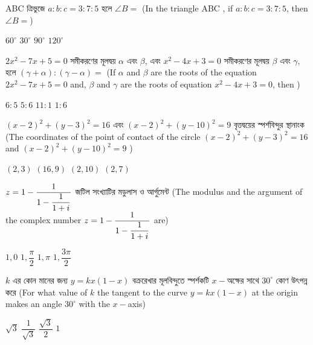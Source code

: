 \documentclass[addpoints]{exam}
\begin{document}
\begin{questions}
\question ABC ত্রিভুজে $ a:b:c = 3:7:5 $ হলে $ \angle B = $ (In the triangle ABC , if $ a:b:c = 3:7:5 $, then $ \angle B = $)

\begin{oneparchoices}
\choice $ 60^{\circ} $
\choice $ 30^{\circ} $
\choice $ 90^{\circ} $
\choice  $ 120^{\circ} $

\end{oneparchoices}

\question  $ 2x^{2}-7x+5 =0 $ সমীকরণের মূলদ্বয় $ \alpha $ এবং $ \beta $, এবং $ x^{2}-4x+3 =0 $ সমীকরণের মূলদ্বয় $ \beta $ এবং $ \gamma $, হলে $ (\gamma+\alpha):(\gamma -\alpha)= $ (If $ \alpha $ and $ \beta $ are the roots of the equation  $ 2x^{2}-7x+5 =0 $ and, $ \beta $ and $ \gamma $ are the roots of equation  $ x^{2}-4x+3 =0 $, then )


\begin{oneparchoices}
\choice $ 6:5 $
\choice $ 5:6 $
\choice $ 11:1 $
\choice  $ 1:6 $

\end{oneparchoices}

\question $ (x-2)^{2} + (y-3)^{2} = 16 $  এবং $ (x-2)^{2} + (y-10)^{2} = 9 $ বৃত্তদ্বয়ের স্পর্শবিন্দুর স্থানাংক (The coordinates of the point of contact of the circle $ (x-2)^{2} + (y-3)^{2} = 16 $ and $ (x-2)^{2} + (y-10)^{2} = 9 $ )

\begin{oneparchoices}
\choice $ (2,3) $
\choice $ (16,9) $
\choice $ (2,10) $
\choice  $ (2,7) $

\end{oneparchoices}

\question $ \mathlarger{z = 1-\dfrac{1}{1-\dfrac{1}{1+i}}} $ জটিল সংখ্যাটির মডুলাস ও আর্গুমেন্ট (The modulus and the argument of the complex number $ \mathlarger{z = 1-\dfrac{1}{1-\dfrac{1}{1+i}}} $ are)

\begin{oneparchoices}
\choice $1,0$
\choice $ 1, \dfrac{\pi}{2} $
\choice $ 1,\pi $
\choice  $ 1, \dfrac{3\pi}{2} $

\end{oneparchoices}

\question  $ k $  এর কোন মানের জন্য $ y =kx(1-x) $ বক্ররেখার মূলবিন্দুতে স্পর্শকটি $ x- $অক্ষের সাথে $ 30^{\circ} $ কোণ উৎপন্ন করে (For what value of $ k $ the tangent to the curve $ y =kx(1-x) $ at the origin makes an angle $ 30^{\circ} $ with the $x-$axis)

\begin{oneparchoices}
\choice $ \sqrt{3} $
\choice $ \dfrac{1}{\sqrt{3}} $
\choice $ \dfrac{\sqrt{3}}{2} $
\choice  $ 1 $


\end{oneparchoices}
\end{questions}
\end{document}
